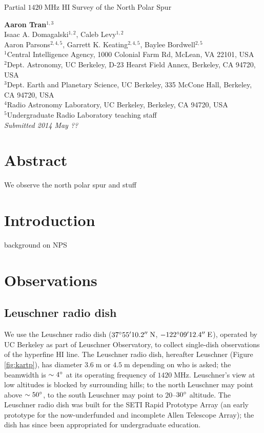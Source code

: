 \documentclass[10pt]{article}
\newcommand {\mt}{\mathrm}
\newcommand {\unit}[1]{\; \mt{#1}}
\begin{document}
\begin{center}
\Large{Partial $1420\unit{MHz}$ HI Survey of the North Polar Spur}

\normalsize
\textbf{Aaron Tran}${}^{1,3}$ \\
Isaac A. Domagalski${}^{1,2}$, Caleb Levy${}^{1,2}$ \\
Aaron Parsons${}^{2,4,5}$, Garrett K. Keating${}^{2,4,5}$, Baylee Bordwell${}^{2,5}$ \\
\footnotesize
${}^1$Central Intelligence Agency, 1000 Colonial Farm Rd, McLean, VA 22101, USA \\
${}^2$Dept. Astronomy, UC Berkeley, D-23 Hearst Field Annex, Berkeley, CA 94720, USA \\
${}^3$Dept. Earth and Planetary Science, UC Berkeley, 335 McCone Hall, Berkeley, CA 94720, USA \\
${}^4$Radio Astronomy Laboratory, UC Berkeley, Berkeley, CA 94720, USA \\
${}^5$Undergraduate Radio Laboratory teaching staff \\
\textit{Submitted 2014 May ??}
\end{center}

\section*{Abstract}

We observe the north polar spur and stuff

\section{Introduction}

background on NPS

\section{Observations}

\subsection{Leuschner radio dish}

We use the Leuschner radio dish ($37\degree 55' 10.2'' \unit{N}$, $-122\degree 09' 12.4'' \unit{E}$), operated by UC Berkeley as part of Leuschner Observatory, to collect single-dish observations of the hyperfine HI line.  The Leuschner radio dish, hereafter Leuschner (Figure \ref{fig:kartp}), has diameter $3.6\unit{m}$ or $4.5\unit{m}$ depending on who is asked; the beamwidth is $\sim4\degree$ at its operating frequency of $1420 \unit{MHz}$.  Leuschner's view at low altitudes is blocked by surrounding hills; to the north Leuschner may point above $\sim50\degree$, to the south Leuschner may point to $20$--$30\degree$ altitude.  The Leuschner radio dish was built for the SETI Rapid Prototype Array (an early prototype for the now-underfunded and incomplete Allen Telescope Array); the dish has since been appropriated for undergraduate education.
\end{document}
